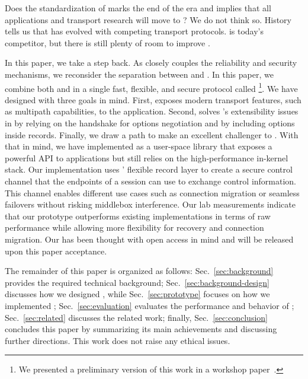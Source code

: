 Does the standardization of \quic marks the end of the \tcp era and implies that
all applications and transport research will move to \quic?  We do not think
so. History tells us that \tcp has evolved with competing transport protocols.
\quic is today's competitor, but there is still plenty of room to improve \tcp.

In this paper, we take a step back. As \quic closely couples the reliability and
security mechanisms, we reconsider the separation between \tcp and \tls.  In
this paper, we combine both \tcp and  in a single fast, flexible, and
secure protocol called \textbf{\tcpls}\footnote{We presented a preliminary version of this
work in a workshop paper~\cite{rochet2020tcpls}.}. We have
designed \tcpls with three goals in mind. First, \tcpls exposes modern transport
features, such as multipath capabilities, to the application. Second, \tcpls
solves \tcp's extensibility issues in \tcp by relying on the \tls handshake for
\tcp options negotiation and by including \tcp options inside \tls records.
Finally, we draw a path to make \tcpls an excellent challenger to \quic.  With that in
mind, we have implemented \tcpls as a user-space library that exposes a powerful
API to applications but still relies on the high-performance in-kernel \tcp
stack. Our implementation uses \tls' flexible record layer to create a secure
control channel that the endpoints of a \tcpls session can use to exchange
control information. This channel enables different use cases such as connection
migration or seamless failovers without risking middlebox interference. Our lab
measurements indicate that our \tcpls prototype outperforms existing \quic
implementations in terms of raw performance while allowing more flexibility
for recovery and connection migration. Our \tcpls has been thought
with open access in mind and will be released upon this paper acceptance.

The remainder of this paper is organized as follows: Sec.~\ref{sec:background}
provides the required technical background; Sec.~\ref{sec:background-design}
discusses how we designed \tcpls, while Sec.~\ref{sec:prototype} focuses on how
we implemented \tcpls; Sec.~\ref{sec:evaluation} evaluates the performance and
behavior of \tcpls; Sec.~\ref{sec:related} discusses the related work;  finally, Sec.~\ref{sec:conclusion} concludes this paper by
summarizing its main achievements and discussing further directions.  This work
does not raise any ethical issues.

